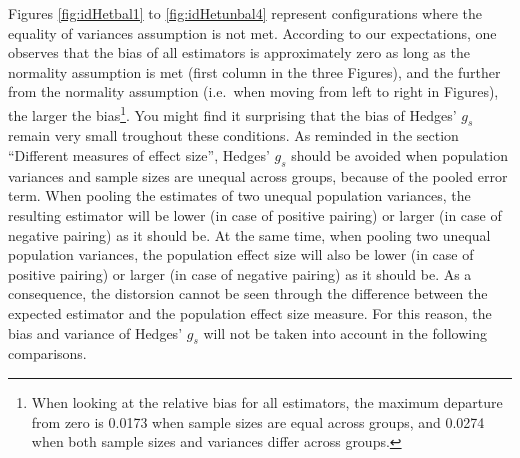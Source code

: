 \documentclass[
  man,floatsintext]{apa6}
\begin{document}
Figures \ref{fig:idHetbal1} to \ref{fig:idHetunbal4} represent configurations where the equality of variances assumption is not met. According to our expectations, one observes that the bias of all estimators is approximately zero as long as the normality assumption is met (first column in the three Figures), and the further from the normality assumption (i.e.~when moving from left to right in Figures), the larger the bias\footnote{When looking at the relative bias for all estimators, the maximum departure from zero is 0.0173 when sample sizes are equal across groups, and 0.0274 when both sample sizes and variances differ across groups.}. You might find it surprising that the bias of Hedges' \(g_s\) remain very small troughout these conditions. As reminded in the section \enquote{Different measures of effect size}, Hedges' \(g_s\) should be avoided when population variances and sample sizes are unequal across groups, because of the pooled error term. When pooling the estimates of two unequal population variances, the resulting estimator will be lower (in case of positive pairing) or larger (in case of negative pairing) as it should be. At the same time, when pooling two unequal population variances, the population effect size will also be lower (in case of positive pairing) or larger (in case of negative pairing) as it should be. As a consequence, the distorsion cannot be seen through the difference between the expected estimator and the population effect size measure. For this reason, the bias and variance of Hedges' \(g_s\) will not be taken into account in the following comparisons.
\end{document}
